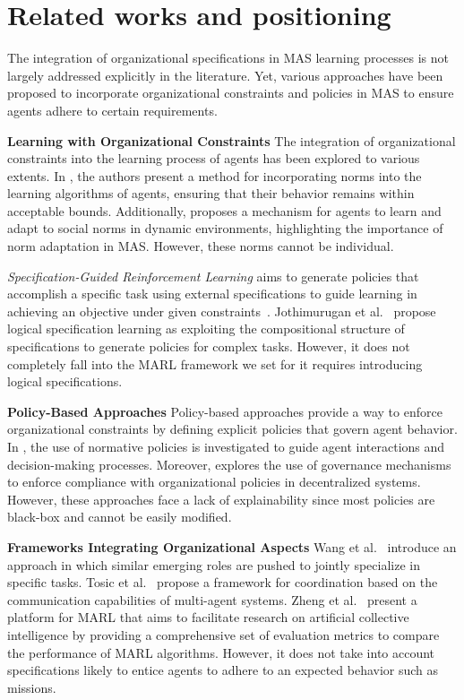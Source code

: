 \documentclass[runningheads]{llncs}
\theoremstyle{freethm}
\theoremstyle{proofoutline}
\begin{document}
\section{Related works and positioning}\label{sec:related_works}

The integration of organizational specifications in MAS learning processes is not largely addressed explicitly in the literature. Yet, various approaches have been proposed to incorporate organizational constraints and policies in MAS to ensure agents adhere to certain requirements.

\textbf{Learning with Organizational Constraints} \quad
%
The integration of organizational constraints into the learning process of agents has been explored to various extents. In \cite{cruz2020norms}, the authors present a method for incorporating norms into the learning algorithms of agents, ensuring that their behavior remains within acceptable bounds. Additionally, \cite{villatoro2011social} proposes a mechanism for agents to learn and adapt to social norms in dynamic environments, highlighting the importance of norm adaptation in MAS. However, these norms cannot be individual.

\emph{Specification-Guided Reinforcement Learning} aims to generate policies that accomplish a specific task using external specifications to guide learning in achieving an objective under given constraints~\cite{Bansal2022}. Jothimurugan et al.~\cite{Jothimurugan2021} propose logical specification learning as exploiting the compositional structure of specifications to generate policies for complex tasks. However, it does not completely fall into the MARL framework we set for it requires introducing logical specifications.

\textbf{Policy-Based Approaches} \quad
%
Policy-based approaches provide a way to enforce organizational constraints by defining explicit policies that govern agent behavior. In \cite{krupanski2015norm}, the use of normative policies is investigated to guide agent interactions and decision-making processes. Moreover, \cite{vos2020governing} explores the use of governance mechanisms to enforce compliance with organizational policies in decentralized systems. However, these approaches face a lack of explainability since most policies are black-box and cannot be easily modified.

\textbf{Frameworks Integrating Organizational Aspects} \quad
%
Wang et al.~\cite{Wang2020} introduce an approach in which similar emerging roles are pushed to jointly specialize in specific tasks. Tosic et al.~\cite{Tosic2010} propose a framework for coordination based on the communication capabilities of multi-agent systems. Zheng et al.~\cite{Zheng2018} present a platform for MARL that aims to facilitate research on artificial collective intelligence by providing a comprehensive set of evaluation metrics to compare the performance of MARL algorithms. However, it does not take into account specifications likely to entice agents to adhere to an expected behavior such as missions.
\end{document}
